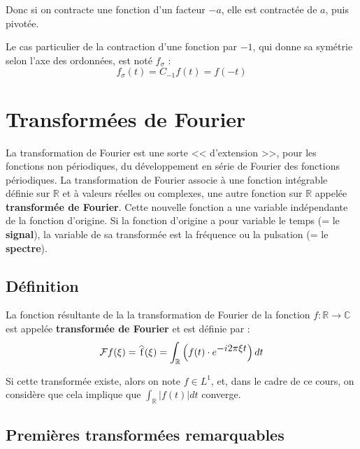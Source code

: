 \documentclass[12pt, a4paper]{article}
\newcommand\reallywidehat[1]{%
\savestack{\tmpbox}{\stretchto{%
  \scaleto{%
    \scalerel*[\widthof{\ensuremath{#1}}]{\kern-.6pt\bigwedge\kern-.6pt}%
    {\rule[-\textheight/2]{1ex}{\textheight}}%
  }{\textheight}%
}{0.5ex}}%
\stackon[1pt]{#1}{\tmpbox}%
}
\begin{document}
Donc si on contracte une fonction d'un facteur $-a$, elle est contractée de $a$, puis pivotée.

\begin{tcolorbox}
	Le cas particulier de la contraction d'une fonction par $-1$, qui donne sa symétrie selon l'axe des ordonnées, est noté $f_{\sigma}$ :
	\begin{equation*}
		f_{\sigma}(t) = C_{-1}f(t) = f(-t)
	\end{equation*}
\end{tcolorbox}


\section{Transformées de Fourier}

La transformation de Fourier est une sorte << d'extension >>, pour les fonctions non périodiques, du développement en série de Fourier des fonctions périodiques. La transformation de Fourier associe à une fonction intégrable définie sur $\mathbb{R}$ et à valeurs réelles ou complexes, une autre fonction sur $\mathbb{R}$ appelée \textbf{transformée de Fourier}. Cette nouvelle fonction a une variable indépendante de la fonction d'origine. Si la fonction d'origine a pour variable le temps (= le \textbf{signal}), la variable de sa transformée est la fréquence ou la pulsation (= le \textbf{spectre}).

\subsection{Définition}

\begin{tcolorbox}
	La fonction résultante de la la transformation de Fourier de la fonction $f:\mathbb{R} \to \mathbb{C}$ est appelée \textbf{transformée de Fourier} et est définie par :
	\begin{equation*}
		\mathcal{F}f(\xi) = \reallywidehat{f}(\xi) = \int_{\mathbb{R}}\left( f(t)\cdot e^{\displaystyle-i2\pi\xi t} \right)dt
	\end{equation*}
	
	Si cette transformée existe, alors on note $\displaystyle f \in L^{1}$, et, dans le cadre de ce cours, on considère que cela implique que $\displaystyle\int_{\mathbb{R}}|f(t)|dt$ converge.
\end{tcolorbox}

\subsection{Premières transformées remarquables}
\end{document}
